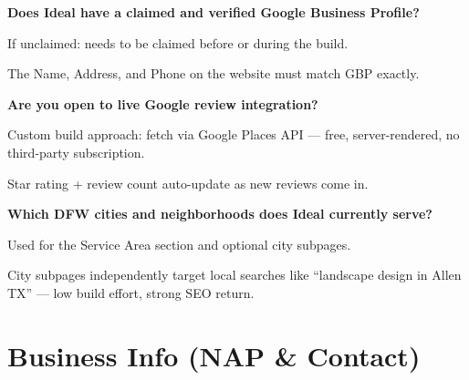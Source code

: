 \documentclass[11pt, letterpaper]{article}
\begin{document}
\begin{checklist}
  \item \textbf{Does Ideal have a claimed and verified Google Business Profile?}
    \begin{checklist}
      \item If unclaimed: needs to be claimed before or during the build.
      \item The Name, Address, and Phone on the website must match GBP exactly.
    \end{checklist}

  \item \textbf{Are you open to live Google review integration?}
    \begin{checklist}
      \item Custom build approach: fetch via Google Places API --- free, server-rendered,
            no third-party subscription.
      \item Star rating + review count auto-update as new reviews come in.
    \end{checklist}

  \item \textbf{Which DFW cities and neighborhoods does Ideal currently serve?}
    \begin{checklist}
      \item Used for the Service Area section and optional city subpages.
      \item City subpages independently target local searches like
            ``landscape design in Allen TX'' --- low build effort, strong SEO return.
    \end{checklist}
\end{checklist}

\section{Business Info (NAP \& Contact)}
\end{document}
